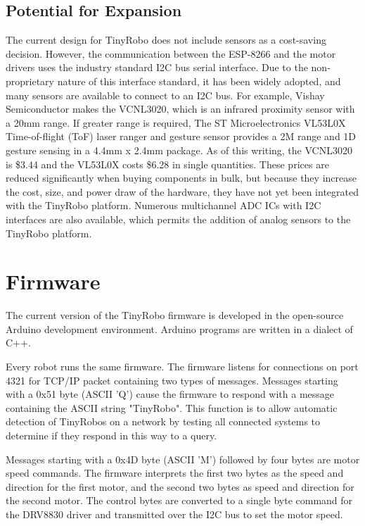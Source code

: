 \documentclass[]{article}
\begin{document}
\subsection{Potential for Expansion}

The current design for TinyRobo does not include sensors as a cost-saving decision. 
However, the communication between the ESP-8266 and the motor drivers uses the industry standard I2C bus serial interface. 
Due to the non-proprietary nature of this interface standard, it has been widely adopted, and many sensors are available to connect to an I2C bus. 
For example, Vishay Semiconductor makes the VCNL3020, which is an infrared proximity sensor with a 20mm range. 
If greater range is required, The ST Microelectronics VL53L0X Time-of-flight (ToF) laser ranger and gesture sensor provides a 2M range and 1D gesture sensing in a 4.4mm x 2.4mm package. 
As of this writing, the VCNL3020 is \$3.44 and the VL53L0X costs \$6.28 in single quantities.
These prices are reduced significantly when buying components in bulk, but because they increase the cost, size, and power draw of the hardware, they have not yet been integrated with the TinyRobo platform. 
Numerous multichannel ADC ICs with I2C interfaces are also available, which permits the addition of analog sensors to the TinyRobo platform. 

\section {Firmware}

The current version of the TinyRobo firmware is developed in the open-source Arduino development environment.
Arduino programs are written in a dialect of C++. 

Every robot runs the same firmware. 
The firmware listens for connections on port 4321 for TCP/IP packet containing two types of messages. 
Messages starting with a 0x51 byte (ASCII 'Q') cause the firmware to respond with a message containing the ASCII string "TinyRobo". 
This function is to allow automatic detection of TinyRobos on a network by testing all connected systems to determine if they respond in this way to a query. 

Messages starting with a 0x4D byte (ASCII 'M') followed by four bytes are motor speed commands.
The firmware interprets the first two bytes as the speed and direction for the first motor, and the second two bytes as speed and direction for the second motor.
The control bytes are converted to a single byte command for the DRV8830 driver and transmitted over the I2C bus to set the motor speed.
 
\end{document}
